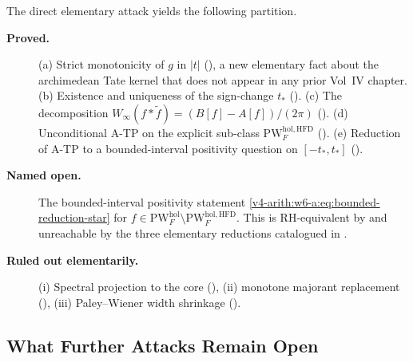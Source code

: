 \begin{remark}
\label{v4-arith:w6-a:rem:honest-status}
The direct elementary attack yields the following partition.

\begin{description}
\item[\textbf{Proved.}] (a) Strict monotonicity of \(g\) in \(|t|\)
(), a new elementary fact about
the archimedean Tate kernel that does not appear in any prior
Vol~IV chapter.
(b) Existence and uniqueness of the sign-change \(t_{\ast}\)
().
(c) The decomposition
\(W_{\infty}(f*\widetilde{f})=(B[f]-A[f])/(2\pi)\)
().
(d) Unconditional A-TP on the explicit sub-class
\(\mathrm{PW}^{\mathrm{hol},\mathrm{HFD}}_{F}\)
().
(e) Reduction of A-TP to a bounded-interval positivity question on
\([-t_{\ast},t_{\ast}]\)
().
\item[\textbf{Named open.}] The bounded-interval positivity
statement \eqref{v4-arith:w6-a:eq:bounded-reduction-star} for
\(f\in\mathrm{PW}^{\mathrm{hol}}_{F}\setminus\mathrm{PW}^{\mathrm{hol},\mathrm{HFD}}_{F}\).
This is RH-equivalent by
 and
unreachable by the three elementary reductions catalogued in
.
\item[\textbf{Ruled out elementarily.}] (i) Spectral projection to the
core (), (ii) monotone
majorant replacement
(), (iii) Paley--Wiener
width shrinkage
().
\end{description}
\end{remark}

\subsection{What Further Attacks Remain Open}
\label{v4-arith:w6-a:irreducible:open-attacks}

